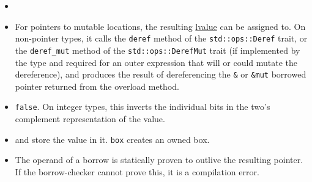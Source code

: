 \documentclass[]{article}
\begin{document}
\begin{itemize}
\item
\item

  For pointers to mutable locations, the resulting
  \hyperref[lvaluesux2c-rvalues-and-temporaries]{lvalue} can be assigned
  to. On non-pointer types, it calls the \texttt{deref} method of the
  \texttt{std::ops::Deref} trait, or the \texttt{deref\_mut} method of
  the \texttt{std::ops::DerefMut} trait (if implemented by the type and
  required for an outer expression that will or could mutate the
  dereference), and produces the result of dereferencing the \texttt{\&}
  or \texttt{\&mut} borrowed pointer returned from the overload method.
\item

  \texttt{false}. On integer types, this inverts the individual bits in
  the two's complement representation of the value.
\item

  and store the value in it. \texttt{box} creates an owned box.
\item

  The operand of a borrow is statically proven to outlive the resulting
  pointer. If the borrow-checker cannot prove this, it is a compilation
  error.
\end{itemize}
\end{document}
